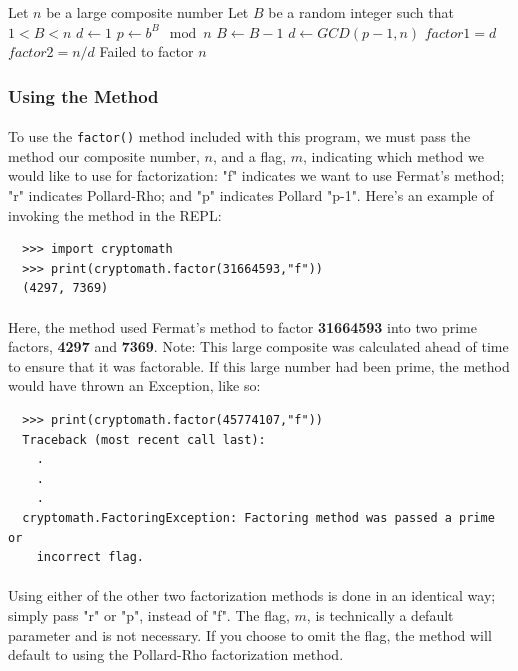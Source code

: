 \documentclass[12pt,a4paper]{article}
\begin{document}
\begin{algorithm}[H]
	\begin{algorithmic}
    \State Let $n$ be a large composite number
    \State Let $B$ be a random integer such that $1 < B < n$
    \State $d \gets 1$
      \State $p \gets b^B \mod{n}$
      \State $B \gets B - 1$
      \State $d \gets GCD(p-1, n)$
    \EndWhile
      \State $factor1 = d$
      \State $factor2 = n/d$
    \Else{}
      \State Failed to factor $n$
    \EndIf
	\end{algorithmic} 
\end{algorithm}

\subsubsection{Using the Method}
\paragraph{}
To use the \verb|factor()| method included with this program, we must pass the
method our composite number, $n$, and a flag, $m$, indicating which method we 
would like to use for factorization: "f" indicates we want to use Fermat's 
method; "r" indicates Pollard-Rho; and "p" indicates Pollard "p-1".  Here's 
an example of invoking the method in the REPL:

\begin{verbatim}
  >>> import cryptomath
  >>> print(cryptomath.factor(31664593,"f"))
  (4297, 7369)
\end{verbatim}

\paragraph{}
Here, the method used Fermat's method to factor \textbf{31664593} into two 
prime factors, \textbf{4297} and \textbf{7369}.  Note:  This 
large composite was calculated ahead of time to ensure that it was factorable.  
If this large number had been prime, the method would have thrown an Exception, 
like so:

\begin{verbatim}
  >>> print(cryptomath.factor(45774107,"f")) 
  Traceback (most recent call last):
    .
    .
    .
  cryptomath.FactoringException: Factoring method was passed a prime or 
    incorrect flag.
\end{verbatim}

\paragraph{}
Using either of the other two factorization methods is done in an identical 
way; simply pass "r" or "p", instead of "f".  The flag, $m$, is technically 
a default parameter and is not necessary.  If you choose to omit the flag, 
the method will default to using the Pollard-Rho factorization method.
\end{document}

